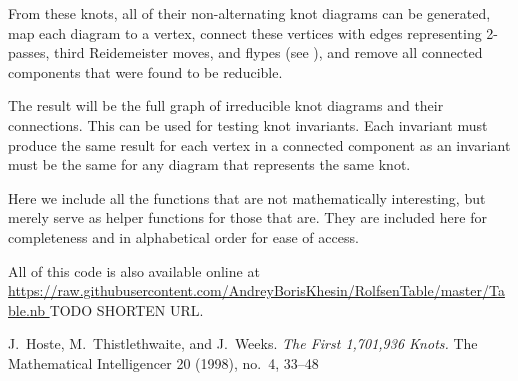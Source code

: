 \begin{paper}
From these knots, all of their non-alternating knot diagrams can be generated,
map each diagram to a vertex, connect these vertices with edges representing
2-passes, third Reidemeister moves, and flypes (see \figMoves), and remove all
connected components that were found to be reducible.


The result will be the full graph of irreducible knot diagrams and their
connections.
This can be used for testing knot invariants.
Each invariant must produce the same result for each vertex in a connected
component as an invariant must be the same for any diagram that represents the
same knot.


Here we include all the functions that are not mathematically interesting, but
merely serve as helper functions for those that are.
They are included here for completeness and in alphabetical order for ease of
access.

All of this code is also available online at \url{
https://raw.githubusercontent.com/AndreyBorisKhesin/RolfsenTable/master/Table.nb
} TODO SHORTEN URL.















\begin{thebibliography}{}
J.~Hoste, M.~Thistlethwaite, and J.~Weeks.
\textit{The First 1,701,936 Knots.}
The Mathematical Intelligencer 20 (1998), no.~4, 33--48
\end{thebibliography}


\end{paper}

